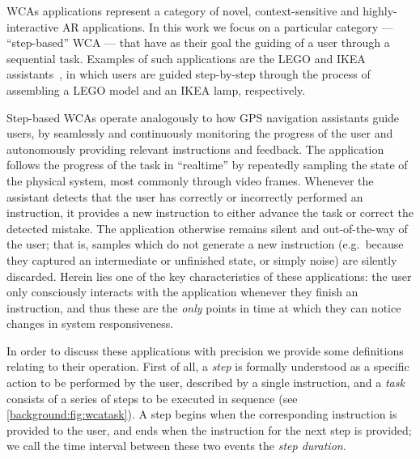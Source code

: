 \glspl{WCA} applications represent a category of novel, context-sensitive and highly-interactive \gls{AR} applications.
In this work we focus on a particular category --- ``step-based'' \gls{WCA} --- that have as their goal the guiding of a user through a sequential task.
Examples of such applications are the LEGO and IKEA assistants~\cite{Chen2015LEGO,Chen2018application}, in which users are guided step-by-step through the process of assembling a LEGO model and an IKEA lamp, respectively.

Step-based \glspl{WCA} operate analogously to how \gls{GPS} navigation assistants guide users, by seamlessly and continuously monitoring the progress of the user and autonomously providing relevant instructions and feedback.
The application follows the progress of the task in ``realtime'' by repeatedly sampling the state of the physical system, most commonly through video frames.
Whenever the assistant detects that the user has correctly or incorrectly performed an instruction, it provides a new instruction to either advance the task or correct the detected mistake.
The application otherwise remains silent and out-of-the-way of the user; that is, samples which do not generate a new instruction (e.g.~because they captured an intermediate or unfinished state, or simply noise) are silently discarded.
Herein lies one of the key characteristics of these applications: the user only consciously interacts with the application whenever they finish an instruction, and thus these are the \emph{only} points in time at which they can notice changes in system responsiveness.

In order to discuss these applications with precision we provide some definitions relating to their operation.
First of all, a \emph{step} is formally understood as a specific action to be performed by the user, described by a single instruction, and a \emph{task} consists of a series of steps to be executed in sequence (see \cref{background:fig:wcatask}).
A step begins when the corresponding instruction is provided to the user, and ends when the instruction for the next step is provided; we call the time interval between these two events the \emph{step duration}.

